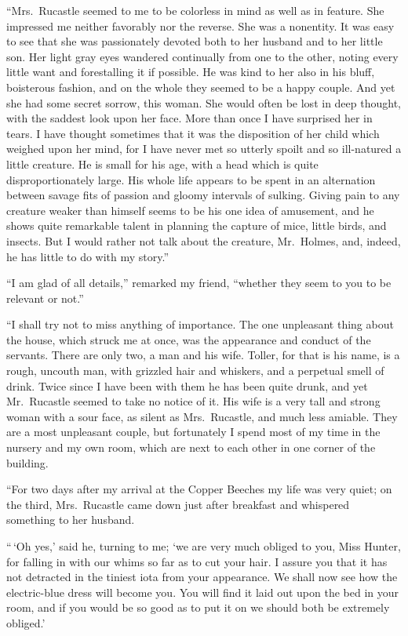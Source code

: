“Mrs.~Rucastle seemed to me to be colorless in mind as
well as in feature. She impressed me neither favorably nor
the reverse. She was a nonentity. It was easy to see that she
was passionately devoted both to her husband and to her little
son. Her light gray eyes wandered continually from one to
the other, noting every little want and forestalling it if possible.
He was kind to her also in his bluff, boisterous fashion,
and on the whole they seemed to be a happy couple. And
yet she had some secret sorrow, this woman. She would often
be lost in deep thought, with the saddest look upon her face.
More than once I have surprised her in tears. I have thought
sometimes that it was the disposition of her child which
weighed upon her mind, for I have never met so utterly spoilt
and so ill-natured a little creature. He is small for his age,
with a head which is quite disproportionately large. His
whole life appears to be spent in an alternation between
savage fits of passion and gloomy intervals of sulking.
Giving pain to any creature weaker than himself seems to
be his one idea of amusement, and he shows quite remarkable
talent in planning the capture of mice, little birds,
and insects. But I would rather not talk about the creature,
Mr.~Holmes, and, indeed, he has little to do with my
story.”

“I am glad of all details,” remarked my friend, “whether
they seem to you to be relevant or not.”

“I shall try not to miss anything of importance. The one
unpleasant thing about the house, which struck me at once,
was the appearance and conduct of the servants. There are
only two, a man and his wife. Toller, for that is his name, is
a rough, uncouth man, with grizzled hair and whiskers, and a
perpetual smell of drink. Twice since I have been with them
he has been quite drunk, and yet Mr.~Rucastle seemed to take
no notice of it. His wife is a very tall and strong woman
with a sour face, as silent as Mrs.~Rucastle, and much less
amiable. They are a most unpleasant couple, but fortunately
I spend most of my time in the nursery and my own room,
which are next to each other in one corner of the building.

“For two days after my arrival at the Copper Beeches my
life was very quiet; on the third, Mrs.~Rucastle came down
just after breakfast and whispered something to her husband.

“\,‘Oh yes,’ said he, turning to me; ‘we are very much obliged
to you, Miss Hunter, for falling in with our whims so far as to
cut your hair. I assure you that it has not detracted in the
tiniest iota from your appearance. We shall now see how the
electric-blue dress will become you. You will find it laid out
upon the bed in your room, and if you would be so good as to
put it on we should both be extremely obliged.’

